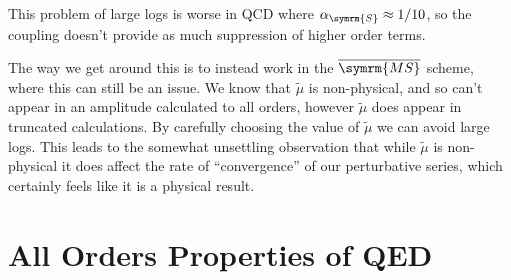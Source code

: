 \documentclass[fleqn]{NotesClass}
\newcommand{\MSbar}{\ensuremath{\overline{\symrm{MS}}}}
\newcommand{\strongCoupling}{\alpha_{\symrm{S}}}
\begin{document}
    This problem of large logs is worse in QCD where \(\strongCoupling \approx 1/10\), so the coupling doesn't provide as much suppression of higher order terms.
    
    The way we get around this is to instead work in the \MSbar{} scheme, where this can still be an issue.
    We know that \(\tilde{\mu}\) is non-physical, and so can't appear in an amplitude calculated to all orders, however \(\tilde{\mu}\) does appear in truncated calculations.
    By carefully choosing the value of \(\tilde{\mu}\) we can avoid large logs.
    This leads to the somewhat unsettling observation that while \(\tilde{\mu}\) is non-physical it does affect the rate of \enquote{convergence} of our perturbative series, which certainly feels like it is a physical result.
    
    \chapter{All Orders Properties of QED}
\end{document}

